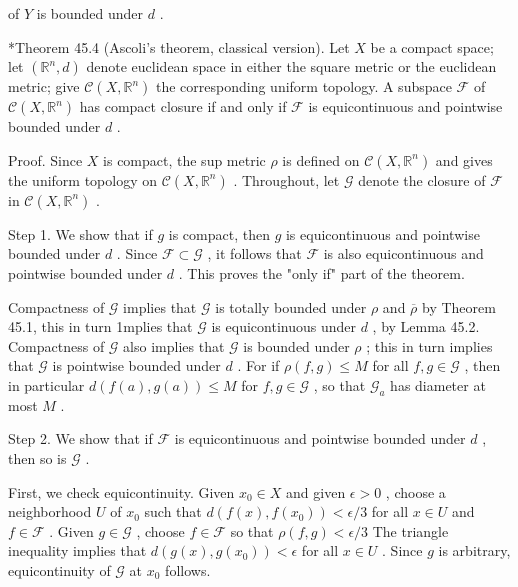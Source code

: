 \documentclass[10pt]{article}
\begin{document}
of \(Y\) is bounded under \(d\) .

*Theorem 45.4 (Ascoli's theorem, classical version). Let \(X\) be a compact space; let \(\left( {{\mathbb{R}}^{n},d}\right)\) denote euclidean space in either the square metric or the euclidean metric; give \(\mathcal{C}\left( {X,{\mathbb{R}}^{n}}\right)\) the corresponding uniform topology. A subspace \(\mathcal{F}\) of \(\mathcal{C}\left( {X,{\mathbb{R}}^{n}}\right)\) has compact closure if and only if \(\mathcal{F}\) is equicontinuous and pointwise bounded under \(d\) .

Proof. Since \(X\) is compact, the sup metric \(\rho\) is defined on \(\mathcal{C}\left( {X,{\mathbb{R}}^{n}}\right)\) and gives the uniform topology on \(\mathcal{C}\left( {X,{\mathbb{R}}^{n}}\right)\) . Throughout, let \(\mathcal{G}\) denote the closure of \(\mathcal{F}\) in \(\mathcal{C}\left( {X,{\mathbb{R}}^{n}}\right)\) .

Step 1. We show that if \(g\) is compact, then \(g\) is equicontinuous and pointwise bounded under \(d\) . Since \(\mathcal{F} \subset  \mathcal{G}\) , it follows that \(\mathcal{F}\) is also equicontinuous and pointwise bounded under \(d\) . This proves the "only if" part of the theorem.

Compactness of \(\mathcal{G}\) implies that \(\mathcal{G}\) is totally bounded under \(\rho\) and \(\overline{\rho }\) by Theorem 45.1, this in turn 1mplies that \(\mathcal{G}\) is equicontinuous under \(d\) , by Lemma 45.2. Compactness of \(\mathcal{G}\) also implies that \(\mathcal{G}\) is bounded under \(\rho\) ; this in turn implies that \(\mathcal{G}\) is pointwise bounded under \(d\) . For if \(\rho \left( {f,g}\right)  \leq  M\) for all \(f,g \in  \mathcal{G}\) , then in particular \(d\left( {f\left( a\right) ,g\left( a\right) }\right)  \leq  M\) for \(f,g \in  \mathcal{G}\) , so that \({\mathcal{G}}_{a}\) has diameter at most \(M\) .

Step 2. We show that if \(\mathcal{F}\) is equicontinuous and pointwise bounded under \(d\) , then so is \(\mathcal{G}\) .

First, we check equicontinuity. Given \({x}_{0} \in  X\) and given \(\epsilon  > 0\) , choose a neighborhood \(U\) of \({x}_{0}\) such that \(d\left( {f\left( x\right) ,f\left( {x}_{0}\right) }\right)  < \epsilon /3\) for all \(x \in  U\) and \(f \in  \mathcal{F}\) . Given \(g \in  \mathcal{G}\) , choose \(f \in  \mathcal{F}\) so that \(\rho \left( {f,g}\right)  < \epsilon /3\) The triangle inequality implies that \(d\left( {g\left( x\right) ,g\left( {x}_{0}\right) }\right)  < \epsilon\) for all \(x \in  U\) . Since \(g\) is arbitrary, equicontinuity of \(\mathcal{G}\) at \({x}_{0}\) follows.
\end{document}
